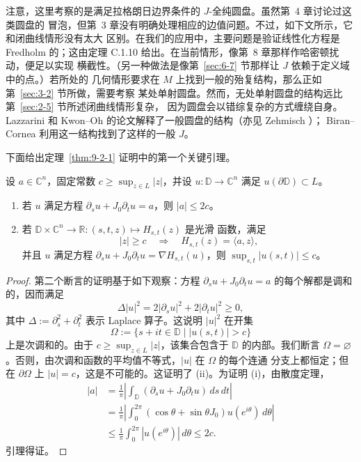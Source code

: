 \begin{remark}\label{rem:9-2-3}
注意，这里考察的是满足拉格朗日边界条件的 $J$-全纯圆盘。虽然第~4 章讨论过这类圆盘的
冒泡，但第~3 章没有明确处理相应的边值问题。不过，如下文所示，它和闭曲线情形没有太大
区别。在我们的应用中，主要问题是验证线性化方程是 Fredholm 的；这由定理 C.1.10
给出。在当前情形，像第~8 章那样作哈密顿扰动，便足以实现
横截性。（另一种做法是像第~\ref{sec:6-7} 节那样让 $J$ 依赖于定义域中的点。）若所处的
几何情形要求在 $M$ 上找到一般的殆复结构，那么正如第~\ref{sec:3-2} 节所做，需要考察
某处单射圆盘。然而，无处单射圆盘的结构远比第~\ref{sec:2-5} 节所述闭曲线情形复杂，
因为圆盘会以错综复杂的方式缠绕自身。Lazzarini  和 Kwon--Oh
 的论文解释了一般圆盘的结构（亦见 Zehmisch ）；
Biran--Cornea  利用这一结构找到了这样的一般 $J$。
\end{remark}

下面给出定理~\ref{thm:9-2-1} 证明中的第一个关键引理。

\begin{lemma}\label{lem:9-2-4}
设 $a\in\mathbb C^n$，固定常数 $c\ge\sup_{z\in L}|z|$，并设
$u:\mathbb D\to\mathbb C^n$ 满足 $u(\partial\mathbb D)\subset L$。

\begin{enumerate}[label=\textup{(\roman*)}]
\item 若 $u$ 满足方程 $\partial_su+J_0\partial_tu=a$，则 $|a|\le2c$。
\item 若 $\mathbb D\times\mathbb C^n\to\mathbb R:(s,t,z)\mapsto H_{s,t}(z)$ 是光滑
函数，满足
\[
  |z|\ge c\quad\Longrightarrow\quad H_{s,t}(z)=\langle a,z\rangle,
\]
并且 $u$ 满足方程
$\partial_su+J_0\partial_tu=\nabla H_{s,t}(u)$，则
$\sup_{s,t}|u(s,t)|\le c$。
\end{enumerate}
\end{lemma}

\begin{proof}
第二个断言的证明基于如下观察：方程
$\partial_su+J_0\partial_tu=a$ 的每个解都是调和的，因而满足
\[
  \Delta|u|^2=2|\partial_su|^2+2|\partial_tu|^2\ge0,
\]
其中 $\Delta:=\partial_s^2+\partial_t^2$ 表示 Laplace 算子。这说明 $|u|^2$ 在开集
\[
  \Omega:=\{s+it\in\mathbb D\mid |u(s,t)|>c\}
\]
上是次调和的。由于 $c\ge\sup_{z\in L}|z|$，该集合包含于 $\mathbb D$ 的内部。我们断言
$\Omega=\varnothing$。否则，由次调和函数的平均值不等式，$|u|$ 在 $\Omega$ 的每个连通
分支上都恒定；但在 $\partial\Omega$ 上 $|u|=c$，这是不可能的。这证明了 (ii)。为证明
(i)，由散度定理，
\[
\begin{aligned}
  |a|
  &=\frac1\pi\left|\int_{\mathbb D}
      (\partial_su+J_0\partial_tu)\,ds\,dt\right| \\
  &=\frac1\pi\left|\int_0^{2\pi}
      (\cos\theta+\sin\theta J_0)u(e^{i\theta})\,d\theta\right| \\
  &\le\frac1\pi\int_0^{2\pi}|u(e^{i\theta})|\,d\theta
  \le2c.
\end{aligned}
\]
引理得证。
\end{proof}

